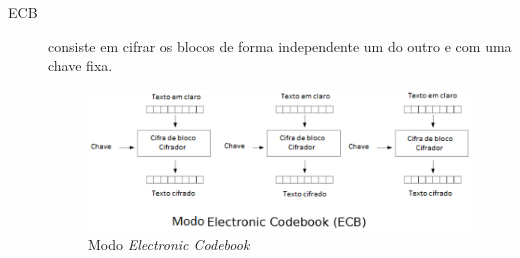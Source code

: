 \begin{description}
\item [ECB]consiste em cifrar os blocos de forma independente um do outro e com uma chave fixa.
\begin{figure}[h]
\centering
\includegraphics[keepaspectratio=true,scale=0.9]
	{figuras/ecb.eps}
	\caption[Modo Electronic Codebook]{Modo \textit{Electronic Codebook}\protect\footnotemark}
	

\end{figure}
\end{description}
